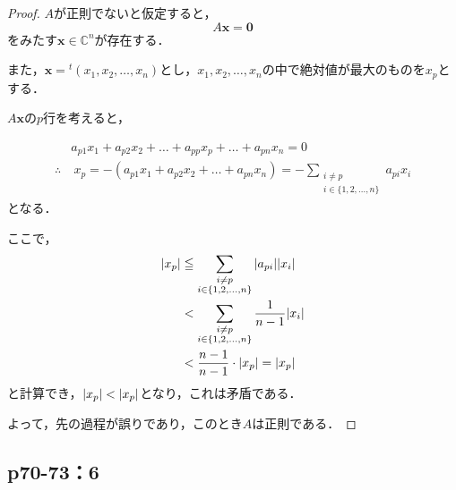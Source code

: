 \documentclass[uplatex,dvipdfmx,a4paper,11pt,fleqn]{jsarticle}
\begin{document}
    \begin{leftbar}
        \begin{proof}
        $A$が正則でないと仮定すると，
        \[
           A \bm{x} = \bm{0}
        \]
        をみたす$\bm{x} \in \mathbb{C}^n$が存在する．

        また，$\bm{x} ={} ^t (x_1,x_2,\dots,x_n)$とし，$x_1,x_2,\dots,x_n$の中で絶対値が最大のものを$x_p$とする．
        
        $A \bm{x}$の$p$行を考えると，

        \begin{align*}
             & a_{p1} x_1 + a_{p2} x_2 + \dots + a_{pp} x_p + \dots + a_{pn} x_n = 0 \\
             \therefore & ~ x_p = -(a_{p1}x_1 + a_{p2} x_2+ \dots + a_{pn} x_n) =- \sum_{\substack{i \ne p \\ i \in \{1,2,\dots,n\}}} a_{pi} x_i 
        \end{align*}
        となる．

        ここで，
        \begin{align*} 
            \abs{x_p} & \leqq \sum_{\substack{i \ne p \\ i \in \{1,2,\dots,n\}}} \abs{a_{pi}} \abs{x_i} \\
            & < \sum_{\substack{i \ne p \\ i \in \{1,2,\dots,n\}}} \frac{1}{n-1} \abs{x_i} \\
            & < \frac{n-1}{n-1} \cdot \abs{x_p} =\abs{x_p}
        \end{align*} 
        と計算でき，$ \abs{x_p} < \abs{x_p}$となり，これは矛盾である．

        よって，先の過程が誤りであり，このとき$A$は正則である．
    \end{proof}
\end{leftbar}
    \newpage 

    \subsection*{p70-73：6}
\end{document}

